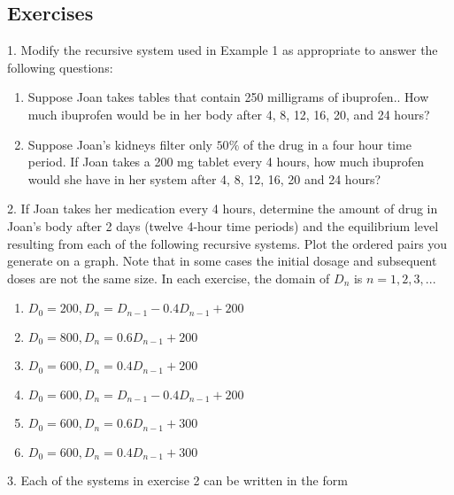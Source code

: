 \documentclass[10pt,]{book}
\theoremstyle{plain}
\theoremstyle{definition}
\theoremstyle{definition}
\numberwithin{equation}{section}
\begin{document}
\subsection[{Exercises}]{Exercises}\label{exercises-1}
\begin{exerciselist}
\item[1.]\hypertarget{exercise-1}{}Modify the recursive  system  used in Example 1 as appropriate to answer the following questions: \leavevmode%
\begin{enumerate}[label=(\alph*)]
\item\hypertarget{li-1}{}Suppose Joan takes tables that contain 250 milligrams of ibuprofen..  How much ibuprofen would be in her body after 4, 8, 12, 16, 20, and 24 hours?%
\item\hypertarget{li-2}{}Suppose Joan’s kidneys filter only \(50\%\) of the drug in a four hour time period.  If Joan takes a 200 mg tablet every 4 hours, how much ibuprofen would she  have in her system after  4, 8, 12, 16, 20 and 24 hours?%
\end{enumerate}
%
\par\smallskip
\item[2.]\hypertarget{exercise-2}{}If Joan takes her medication every 4 hours, determine the amount of drug in Joan’s body after 2 days (twelve  4-hour time periods) and the equilibrium level resulting from each of the following recursive systems.  Plot the ordered pairs you generate on a graph.  Note that in some cases the initial dosage and subsequent doses are not the same size.  In each exercise, the domain of \(D_n\) is \(n=1,2,3, ...\) \leavevmode%
\begin{enumerate}[label=(\alph*)]
\item\hypertarget{li-3}{}\(D_0=200, D_n=D_{n-1} - 0.4D_{n-1} + 200\)%
\item\hypertarget{li-4}{}\(D_0=800, D_n=0.6D_{n-1} + 200\)%
\item\hypertarget{li-5}{}\(D_0=600, D_n=0.4D_{n-1} + 200\)%
\item\hypertarget{li-6}{}\(D_0=600, D_n=D_{n-1} - 0.4D_{n-1} + 200\)%
\item\hypertarget{li-7}{}\(D_0=600, D_n=0.6D_{n-1} + 300\)%
\item\hypertarget{li-8}{}\(D_0=600, D_n=0.4D_{n-1} + 300\)%
\end{enumerate}
%
\par\smallskip
\item[3.]\hypertarget{exercise-3}{}Each of the systems in exercise 2 can be written in the form%
\begin{gather*}

\end{gather*}
\end{exerciselist}
\end{document}
